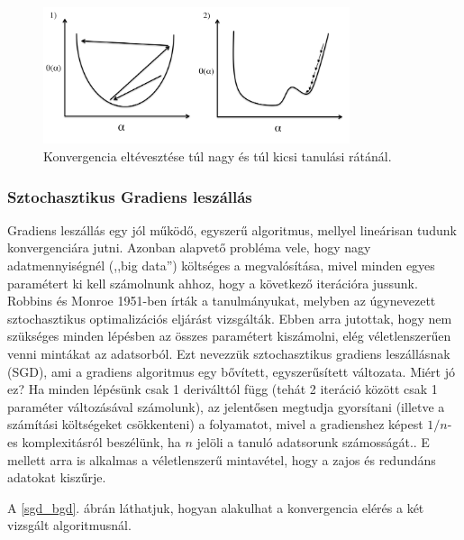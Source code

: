 \documentclass[a4paper,12pt]{article}
\begin{document}
\begin{figure}[ht!]
\centering
\includegraphics[width=90mm]{img/alfa.png}
\caption{Konvergencia eltévesztése túl nagy és túl kicsi tanulási rátánál.\cite{learningrate} \label{alfa}}
\end{figure}

\subsubsection{Sztochasztikus Gradiens leszállás}

Gradiens leszállás egy jól működő, egyszerű algoritmus, mellyel lineárisan tudunk konvergenciára jutni. Azonban alapvető probléma vele, hogy nagy adatmennyiségnél (,,big data'') költséges a megvalósítása, mivel minden egyes paramétert ki kell számolnunk ahhoz, hogy a következő iterációra jussunk. Robbins és Monroe 1951-ben\cite{stoch1951} írták a tanulmányukat, melyben az úgynevezett sztochasztikus optimalizációs eljárást vizsgálták. Ebben arra jutottak, hogy nem szükséges minden lépésben az összes paramétert kiszámolni, elég véletlenszerűen venni mintákat az adatsorból. Ezt nevezzük sztochasztikus gradiens leszállásnak (SGD), ami a gradiens algoritmus egy bővített, egyszerűsített változata. \newline
Miért jó ez? Ha minden lépésünk csak 1 deriválttól függ (tehát 2 iteráció között csak 1 paraméter változásával számolunk), az jelentősen megtudja gyorsítani (illetve a számítási költségeket csökkenteni) a folyamatot, mivel a gradienshez képest $1/n$-es komplexitásról beszélünk, ha $n$ jelöli a tanuló adatsorunk számosságát.\cite{asgd}. E mellett arra is alkalmas a véletlenszerű mintavétel, hogy a zajos és redundáns adatokat kiszűrje. \cite{gatsby} \newline

A \ref{sgd_bgd}. ábrán láthatjuk, hogyan alakulhat a konvergencia elérés a két vizsgált algoritmusnál. 
\end{document}
